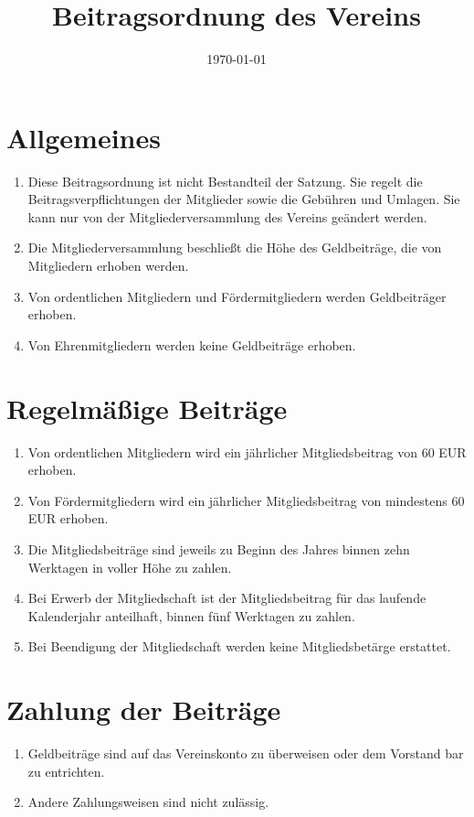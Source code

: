 \documentclass[12pt,a4paper,draft]{article}
\title{Beitragsordnung des Vereins \unsername}
\author{\unsername}
\date{\today}
\begin{document}
\maketitle
\tableofcontents

\section{Allgemeines}
\begin{enumerate}
\item Diese Beitragsordnung ist nicht Bestandteil der Satzung. Sie regelt die 
Beitragsverpflichtungen der Mitglieder sowie die Gebühren und Umlagen. Sie kann 
nur von der Mitgliederversammlung des Vereins geändert werden.

\item Die Mitgliederversammlung beschließt die Höhe des Geldbeiträge, die von 
Mitgliedern erhoben werden.

\item Von ordentlichen Mitgliedern und Fördermitgliedern werden Geldbeiträger 
erhoben.

\item Von Ehrenmitgliedern werden keine Geldbeiträge erhoben.
\end{enumerate}

\section{Regelmäßige Beiträge}
\begin{enumerate}
\item Von ordentlichen Mitgliedern wird ein jährlicher Mitgliedsbeitrag von 60 
EUR erhoben.

\item Von Fördermitgliedern wird ein jährlicher Mitgliedsbeitrag von mindestens 
60 EUR erhoben.

\item Die Mitgliedsbeiträge sind jeweils zu Beginn des Jahres binnen zehn 
Werktagen in voller Höhe zu zahlen.

\item Bei Erwerb der Mitgliedschaft ist der Mitgliedsbeitrag für das laufende 
Kalenderjahr anteilhaft, binnen fünf Werktagen zu zahlen.

\item Bei Beendigung der Mitgliedschaft werden keine Mitgliedsbetärge erstattet.
\end{enumerate}

\section{Zahlung der Beiträge}
\begin{enumerate}
\item Geldbeiträge sind auf das Vereinskonto zu überweisen oder dem Vorstand 
bar zu entrichten.

\item Andere Zahlungsweisen sind nicht zulässig.
\end{enumerate}
\end{document}
